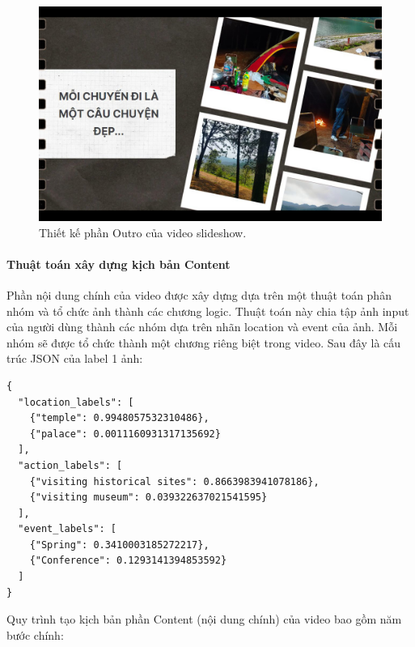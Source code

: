 \begin{enumerate}
    \begin{figure}[H]
        \centering  
        \includegraphics[width=1\textwidth]{figures/c4/4_1/outro.jpg}
        \caption{Thiết kế phần Outro của video slideshow.}
        \label{fig:video-outro-design}
    \end{figure}
\end{enumerate}

\paragraph{Thuật toán xây dựng kịch bản Content}
Phần nội dung chính của video được xây dựng dựa trên một thuật toán phân nhóm và tổ chức ảnh thành các chương logic. Thuật toán này chia tập ảnh input của người dùng thành các nhóm dựa trên nhãn location và event của ảnh. Mỗi nhóm sẽ được tổ chức thành một chương riêng biệt trong video. Sau đây là cấu trúc JSON của label 1 ảnh:

\newpage
\lstset{language=json}
\begin{lstlisting}
{
  "location_labels": [
    {"temple": 0.9948057532310486},
    {"palace": 0.0011160931317135692}
  ],
  "action_labels": [
    {"visiting historical sites": 0.8663983941078186},
    {"visiting museum": 0.039322637021541595}
  ],
  "event_labels": [
    {"Spring": 0.3410003185272217},
    {"Conference": 0.1293141394853592}
  ]
}
\end{lstlisting}

Quy trình tạo kịch bản phần Content (nội dung chính) của video bao gồm năm bước chính:

